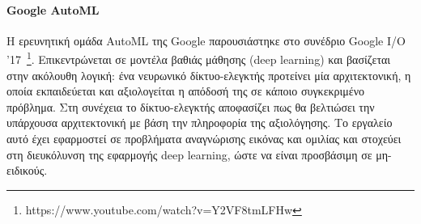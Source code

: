  \paragraph{Google AutoML} Η ερευνητική ομάδα AutoML της Google παρουσιάστηκε στο συνέδριο Google I/O '17~\footnote{https://www.youtube.com/watch?v=Y2VF8tmLFHw}. Επικεντρώνεται σε μοντέλα βαθιάς μάθησης (deep learning) και βασίζεται στην ακόλουθη λογική: ένα νευρωνικό δίκτυο-ελεγκτής προτείνει μία αρχιτεκτονική, η οποία εκπαιδεύεται και αξιολογείται η απόδοσή της σε κάποιο συγκεκριμένο πρόβλημα. Στη συνέχεια το δίκτυο-ελεγκτής αποφασίζει πως θα βελτιώσει την υπάρχουσα αρχιτεκτονική με βάση την πληροφορία της αξιολόγησης. Το εργαλείο αυτό έχει εφαρμοστεί σε προβλήματα αναγνώρισης εικόνας και ομιλίας και στοχεύει στη διευκόλυνση της εφαρμογής deep learning, ώστε να είναι προσβάσιμη σε μη-ειδικούς.
 